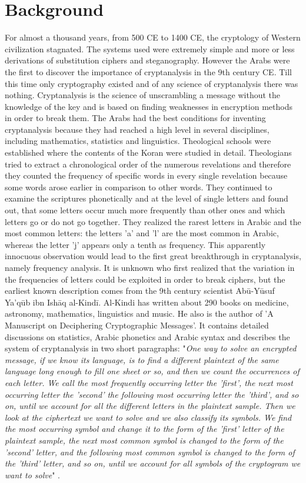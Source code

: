\section{Background}

For almost a thousand years, from 500 CE to 1400 CE, the cryptology of Western civilization stagnated. The systems used were extremely simple and more or less derivations of substitution ciphers and steganography. However the Arabs were the first to discover the importance of cryptanalysis in the 9th century CE. Till this time only cryptography existed and of any science of cryptanalysis there was nothing. Cryptanalysis is the science of unscrambling a message without the knowledge of the key and is based on finding weaknesses in encryption methods in order to break them. The Arabs had the best conditions for inventing cryptanalysis because they had reached a high level in several disciplines, including mathematics, statistics and linguistics. Theological schools were established where the contents of the Koran were studied in detail. Theologians tried to extract a chronological order of the numerous revelations and therefore they counted the frequency of specific words in every single revelation because some words arose earlier in comparison to other words. They continued to examine the scriptures phonetically and at the level of single letters and found out, that some letters occur much more frequently than other ones and which letters go or do not go together. They realized the rarest letters in Arabic and the most common letters: the letters 'a' and 'l' are the most common in Arabic, whereas the letter 'j' appears only a tenth as frequency. This apparently innocuous observation would lead to the first great breakthrough in cryptanalysis, namely frequency analysis. It is unknown who first realized that the variation in the frequencies of letters could be exploited in order to break ciphers, but the earliest known description comes from the 9th century scientist Abū-Yūsuf Ya’qūb ibn Ishāq al-Kindī. Al-Kindi has written about 290 books on medicine, astronomy, mathematics, linguistics and music. He also is the author of 'A Manuscript on Deciphering Cryptographic Messages'. It contains detailed discussions on statistics, Arabic phonetics and Arabic syntax and describes the system of cryptanalysis in two short paragraphs: "\textit{One way to solve an encrypted message, if we know its language, is to find a different plaintext of the same language long enough to fill one sheet or so, and then we count the occurrences of each letter. We call the most frequently occurring letter the 'first', the next most occurring letter the 'second' the following most occurring letter the 'third', and so on, until we account for all the different letters in the plaintext sample. Then we look at the ciphertext we want to solve and we also classify its symbols. We find the most occurring symbol and change it to the form of the 'first' letter of the plaintext sample, the next most common symbol is changed to the form of the 'second' letter, and the following most common symbol is changed to the form of the 'third' letter, and so on, until we account for all symbols of the cryptogram we want to solve}" \cite{frequency_analysis}.
